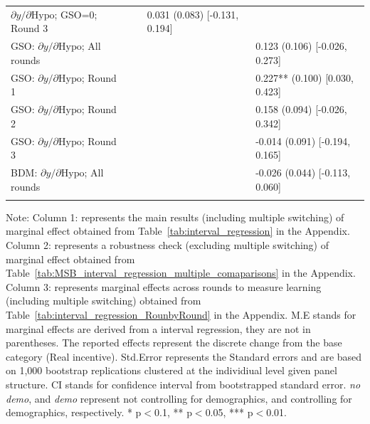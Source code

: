 \documentclass[12pt]{article}
\begin{document}
\begin{table}[H]
\begin{threeparttable}
\begin{tabular}{L{4.5cm} *{4}{C{2.2cm}}}
$\partial y/\partial\mathrm{Hypo}$; GSO=0; Round 3   &       &       & 0.031 (0.083) [-0.131, 0.194]  &       \\
\addlinespace[2pt]
\midrule
GSO: $\partial y/\partial\mathrm{Hypo}$; All rounds  &       &       &       & 0.123 (0.106) [-0.026, 0.273] \\
GSO: $\partial y/\partial\mathrm{Hypo}$; Round 1     &       &       &       & 0.227** (0.100) [0.030, 0.423]\\
GSO: $\partial y/\partial\mathrm{Hypo}$; Round 2     &       &       &       & 0.158 (0.094) [-0.026, 0.342] \\
GSO: $\partial y/\partial\mathrm{Hypo}$; Round 3     &       &       &       & -0.014 (0.091) [-0.194, 0.165]\\
BDM: $\partial y/\partial\mathrm{Hypo}$; All rounds  &       &       &       & -0.026 (0.044) [-0.113, 0.060] \\

\\[-3pt]
\bottomrule
\end{tabular}
\begin{tablenotes}
\footnotesize
\item Note: Column 1: represents the main results (including multiple switching) of marginal effect obtained from Table~\ref{tab:interval_regression} in the Appendix. Column 2: represents a robustness check (excluding multiple switching) of marginal effect obtained from Table~\ref{tab:MSB_interval_regression_multiple_comaparisons} in the Appendix. Column 3: represents marginal effects across rounds to measure learning (including multiple switching) obtained from Table~\ref{tab:interval_regression_RounbyRound} in the Appendix. 
M.E stands for marginal effects are derived from a interval regression, they are not in parentheses. The reported effects represent the discrete change from the base category (Real incentive). Std.Error represents the Standard errors and  are based on 1,000 bootstrap replications clustered at the individiual level given panel structure. CI stands for confidence interval from bootstrapped standard error. \textit{no demo}, and \textit{demo} represent not controlling for demographics, and controlling for demographics, respectively. * p$<$0.1, ** p$<$0.05, *** p$<$0.01.
\end{tablenotes}
\end{threeparttable}
\end{table}


\end{document}
